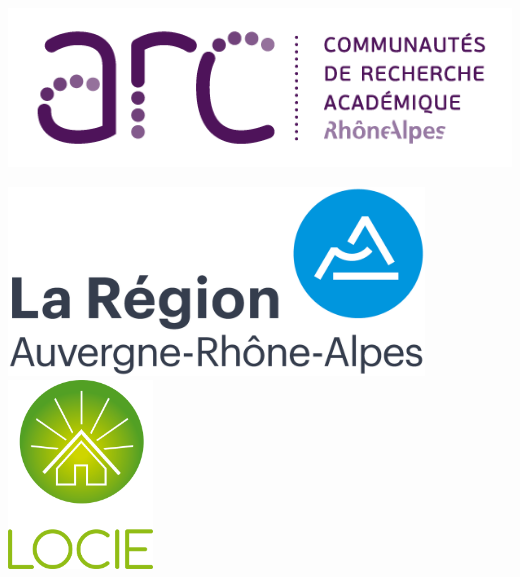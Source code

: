 \documentclass[a0,portrait]{a0poster}
\begin{document}
\begin{minipage}[b]{0.5\linewidth}
\begin{flushright}
	\includegraphics[height=5cm]{logo-arc-72dpi}
    \hspace{1cm}
    \includegraphics[height=5cm]{logo-ara}
	\hspace{1cm}
	\includegraphics[height=5cm]{locie-logo}
\end{flushright}
\vspace{10cm}
\end{minipage}

\vspace{1cm}

\color{DarkSlateGray}
\end{document}
